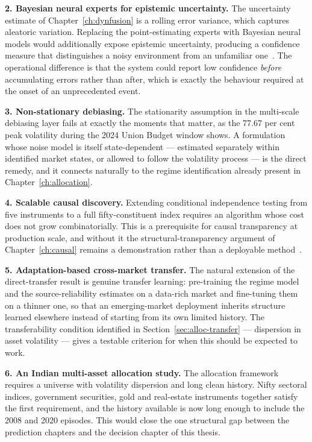 \textbf{2. Bayesian neural experts for epistemic uncertainty.} The uncertainty estimate of
Chapter~\ref{ch:dynfusion} is a rolling error variance, which captures aleatoric variation.
Replacing the point-estimating experts with Bayesian neural models would additionally expose
epistemic uncertainty, producing a confidence measure that distinguishes a noisy environment from
an unfamiliar one~\cite{gal2016dropout,kendall2017,khuwaja2023}. The operational difference is
that the system could report low confidence \emph{before} accumulating errors rather than after,
which is exactly the behaviour required at the onset of an unprecedented event.

\textbf{3. Non-stationary debiasing.} The stationarity assumption in the multi-scale debiasing layer
fails at exactly the moments that matter, as the 77.67 per cent peak volatility during the 2024
Union Budget window shows. A formulation whose noise model is itself state-dependent --- estimated
separately within identified market states, or allowed to follow the volatility process --- is the
direct remedy, and it connects naturally to the regime identification already present in
Chapter~\ref{ch:allocation}.

\textbf{4. Scalable causal discovery.} Extending conditional independence testing from five
instruments to a full fifty-constituent index requires an algorithm whose cost does not grow
combinatorially. This is a prerequisite for causal transparency at production scale, and without it
the structural-transparency argument of Chapter~\ref{ch:causal} remains a demonstration rather than
a deployable
method~\cite{liu2026dynamic,spirtes2000}.

\textbf{5. Adaptation-based cross-market transfer.} The natural extension of the direct-transfer
result is genuine transfer learning: pre-training the regime model and the source-reliability
estimates on a data-rich market and fine-tuning them on a thinner one, so that an emerging-market
deployment inherits structure learned elsewhere instead of starting from its own limited history.
The transferability condition identified in Section~\ref{sec:alloc-transfer} --- dispersion in
asset volatility --- gives a testable criterion for when this should be expected to work.

\textbf{6. An Indian multi-asset allocation study.} The allocation framework requires a universe
with volatility dispersion and long clean history. Nifty sectoral indices, government securities,
gold and real-estate instruments together satisfy the first requirement, and the history available
is now long enough to include the 2008 and 2020 episodes. This would close the one structural gap
between the prediction chapters and the decision chapter of this thesis.

